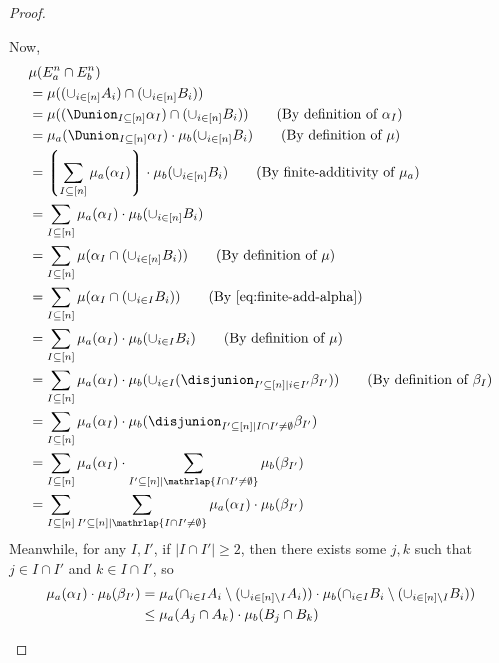 \begin{proof}
\begin{itemize}
   Now,
  \begin{align}
   &\mu(E^n_a \cap E^n_b) \notag \\
   &= \mu((\cup_{i \in [n]} A_i) \cap (\cup_{i \in [n]} B_i)) \notag \\
   &= \mu((\Dunion_{I \subseteq [n]} \alpha_I) \cap (\cup_{i \in [n]} B_i)) \tag{By definition of $\alpha_I$}\\
   &= \mu_a(\Dunion_{I \subseteq [n]} \alpha_I) \cdot  \mu_b(\cup_{i \in [n]} B_i)  \tag{By definition of $\mu$} \\
   &= \left\lgroup\sum_{I \subseteq [n]} \mu_a (\alpha_I) \right\rgroup \cdot  \mu_b(\cup_{i \in [n]} B_i)  \tag{By finite-additivity of $\mu_a$} \\
   &= \sum_{I \subseteq [n]} \mu_a (\alpha_I) \cdot  \mu_b(\cup_{i \in [n]} B_i) \notag\\
   &= \sum_{I \subseteq [n]}  \mu(\alpha_I \cap (\cup_{i \in [n]} B_i)) \tag{By definition of $\mu$} \\
   &= \sum_{I \subseteq [n]}  \mu(\alpha_I \cap (\cup_{i \in I} B_i))
   \tag{By~\cref{eq:finite-add-alpha}}\\
   &= \sum_{I \subseteq [n]}  \mu_a(\alpha_I) \cdot \mu_b (\cup_{i \in I} B_i)\tag{By definition of $\mu$} \\
   &= \sum_{I \subseteq [n]}  \mu_a(\alpha_I) \cdot \mu_b (\cup_{i \in I} (\disjunion_{I' \subseteq [n] \mid i \in I'} \beta_{I'}))
   \tag{By definition of $\beta_I$} \\
   &= \sum_{I \subseteq [n]}  \mu_a(\alpha_I) \cdot \mu_b (\disjunion_{I' \subseteq [n] \mid I \cap I' \neq \emptyset} \beta_{I'}) \notag \\
   &= \sum_{I \subseteq [n]}  \mu_a(\alpha_I) \cdot \sum_{I' \subseteq [n] \mid \mathrlap{I \cap I' \neq \emptyset}} \mu_b (\beta_{I'}) \notag \\
   &= \sum_{I \subseteq [n]} \sum_{I' \subseteq [n] \mid \mathrlap{I \cap I' \neq \emptyset}}  \mu_a(\alpha_I) \cdot \mu_b (\beta_{I'}) \notag
  \end{align}
Meanwhile, for any $I, I'$, if $|I \cap I'| \geq 2$,
  then there exists some $j, k$ such that $j \in I \cap I'$ and $k \in I \cap I'$,
  so
\begin{align}
    \mu_{a}(\alpha_I) \cdot \mu_{b}(\beta_{I'})
    &= \mu_{a}(\cap_{i \in I} A_i \setminus (\cup_{i \in [n] \setminus I} A_i)) \cdot \mu_{b}(\cap_{i \in I} B_i \setminus (\cup_{i \in [n] \setminus I} B_i)) \notag \\
    &\leq \mu_{a}(A_j \cap A_k) \cdot \mu_{b}(B_j \cap B_k) \notag \\

\end{align}
\end{itemize}
\end{proof}
